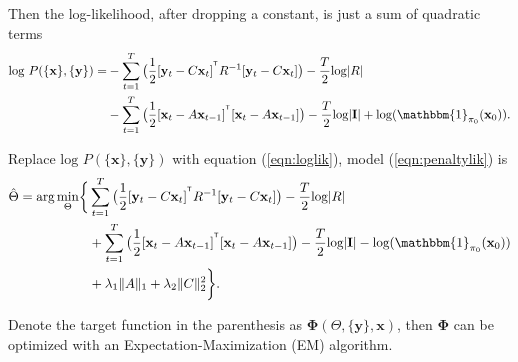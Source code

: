 \documentclass[fleqn]{article}
\let\oldref\ref
\renewcommand{\ref}[1]{(\oldref{#1})}
\newcommand{\T}{^{\ensuremath{\mathsf{T}}}}           %
\begin{document}
Then the log-likelihood, after dropping a constant, is just a sum of quadratic terms
\begin{equation}\label{eqn:loglik}
\begin{split}
\text{log } P(\{\mathbf{x}\},\{\mathbf{y}\})=&-\sum\limits_{t=1}^{T}\big(\frac{1}{2}[\mathbf{y}_t-C\mathbf{x}_t]^{\T}R^{-1}[\mathbf{y}_t-C\mathbf{x}_t]\big)-\frac{T}{2}\text{log}|R|\\
&-\sum\limits_{t=1}^{T}\big(\frac{1}{2}[\mathbf{x}_t-A\mathbf{x}_{t-1}]^{\T}[\mathbf{x}_t-A\mathbf{x}_{t-1}]\big)-\frac{T}{2}\text{log}|\mathbf{I}|+ \text{log}(\mathbbm{1}_{\mathbf{\pi}_0}(\mathbf{x}_0)).
\end{split}
\end{equation}

Replace $\text{log } P(\{\mathbf{x}\},\{\mathbf{y}\})$ with equation \ref{eqn:loglik}, model \ref{eqn:penaltylik} is
\begin{equation}\label{eqn:penaltylik2}
\begin{split}
\hat{\Theta}=\text{arg}\min_{\substack{\Theta}}\biggl\{&\sum\limits_{t=1}^{T}\big(\frac{1}{2}[\mathbf{y}_t-C\mathbf{x}_t]^{\T}R^{-1}[\mathbf{y}_t-C\mathbf{x}_t]\big)-\frac{T}{2}\text{log}|R|\\
&+\sum\limits_{t=1}^{T}\big(\frac{1}{2}[\mathbf{x}_t-A\mathbf{x}_{t-1}]^{\T}[\mathbf{x}_t-A\mathbf{x}_{t-1}]\big)-\frac{T}{2}\text{log}|\mathbf{I}| - \text{log}(\mathbbm{1}_{\mathbf{\pi}_0}(\mathbf{x}_0))\\
&+\lambda_1\|A\|_1+\lambda_2\|C\|_2^2\biggr\}.
\end{split}
\end{equation}

Denote the target function in the parenthesis as $\mathbf{\Phi}(\Theta,\{\mathbf{y}\},\mathbf{x})$, then $\mathbf{\Phi}$ can be optimized with an Expectation-Maximization (EM) algorithm.
\end{document}
